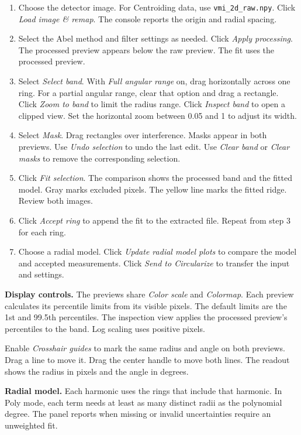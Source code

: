 \documentclass[11pt,a4paper]{article}
\newcommand{\code}[1]{\texttt{#1}}
\begin{document}
\begin{enumerate}
  \item Choose the detector image. For Centroiding data, use
        \code{vmi\_2d\_raw.npy}. Click \emph{Load image \& remap}.
        The console reports the origin and radial spacing.
  \item Select the Abel method and filter settings as needed. Click
        \emph{Apply processing}. The processed preview appears below the
        raw preview. The fit uses the processed preview.
  \item Select \emph{Select band}. With \emph{Full angular range} on, drag
        horizontally across one ring. For a partial angular range, clear
        that option and drag a rectangle.
        Click \emph{Zoom to band} to limit the radius range.
        Click \emph{Inspect band} to open a clipped view. Set the
        horizontal zoom between 0.05 and 1 to adjust its width.
  \item Select \emph{Mask}. Drag rectangles over interference.
        Masks appear in both previews. Use \emph{Undo selection} to undo
        the last edit. Use \emph{Clear band} or \emph{Clear masks} to remove
        the corresponding selection.
  \item Click \emph{Fit selection}. The comparison shows the processed
        band and the fitted model. Gray marks excluded pixels.
        The yellow line marks the fitted ridge. Review both images.
  \item Click \emph{Accept ring} to append the fit to the extracted file.
        Repeat from step 3 for each ring.
  \item Choose a radial model. Click \emph{Update radial model plots}
        to compare the model and accepted measurements.
        Click \emph{Send to Circularize} to transfer the input and settings.
\end{enumerate}

\textbf{Display controls.} The previews share \emph{Color scale} and
\emph{Colormap}. Each preview calculates its percentile limits from its
visible pixels. The default limits are the 1st and 99.5th percentiles.
The inspection view applies the processed preview's percentiles to the band.
Log scaling uses positive pixels.

Enable \emph{Crosshair guides} to mark the same radius and angle on both
previews. Drag a line to move it. Drag the center handle to move both lines.
The readout shows the radius in pixels and the angle in degrees.

\textbf{Radial model.} Each harmonic uses the rings that include that
harmonic. In Poly mode, each term needs at least as many distinct radii
as the polynomial degree. The panel reports when missing or invalid
uncertainties require an unweighted fit.
\end{document}
